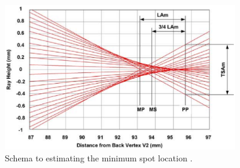 \begin{figure}[httbp]
\centering
\includegraphics[width=0.9\textwidth]{bilder/min_max_spot}
\caption{Schema to estimating the minimum spot location \cite{lens_theory_LC_Ltd}.}
\label{fig:min_max_spot}
\end{figure}

